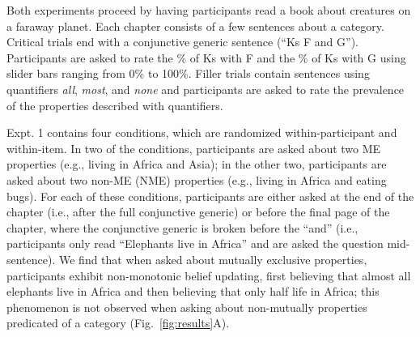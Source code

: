 \documentclass[letterpaper, 12pt]{article}
\begin{document}

Both experiments proceed by having participants read a book about creatures on a faraway planet. Each chapter consists of a few sentences about a category. Critical trials end with a conjunctive generic sentence (``Ks F and G''). Participants are asked to rate the \% of Ks with F and the \% of Ks with G using slider bars ranging from 0\% to 100\%. Filler trials contain sentences using quantifiers \emph{all}, \emph{most}, and \emph{none} and participants are asked to rate the prevalence of the properties described with quantifiers. 

Expt. 1 contains four conditions, which are randomized within-participant and within-item. In two of the conditions, participants are asked about two ME properties (e.g., living in Africa and Asia); in the other two, participants are asked about two non-ME (NME) properties (e.g., living in Africa and eating bugs). For each of these conditions, participants are either asked at the end of the chapter (i.e., after the full conjunctive generic) or before the final page of the chapter, where the conjunctive generic is broken before the ``and'' (i.e., participants only read ``Elephants live in Africa'' and are asked the question mid-sentence). We find that when asked about mutually exclusive properties, participants exhibit non-monotonic belief updating, first believing that almost all elephants live in Africa and then believing that only half life in Africa; this phenomenon is not observed when asking about non-mutually properties predicated of a category (Fig.~\ref{fig:results}A).
\end{document}
